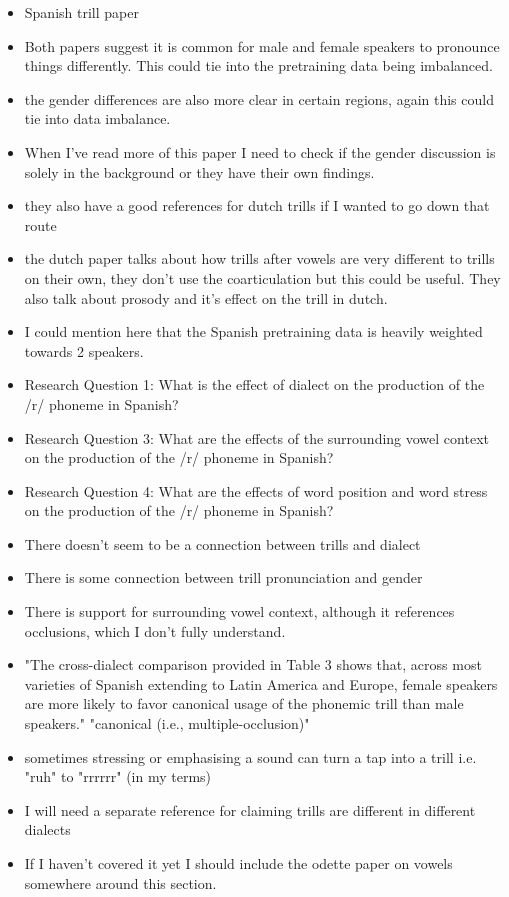\begin{itemize}
    \item Spanish trill paper \cite{henriksen2023sociophonetic}
    \item Both papers suggest it is common for male and female speakers to pronounce things differently. This could tie into the pretraining data being imbalanced.
    \item the gender differences are also more clear in certain regions, again this could tie into data imbalance. 
    \item When I've read more of this paper I need to check if the gender discussion is solely in the background or they have their own findings.
    \item they also have a good references for dutch trills if I wanted to go down that route
    \item the dutch paper talks about how trills after vowels are very different to trills on their own, they don't use the coarticulation but this could be useful. They also talk about prosody and it's effect on the trill in dutch.
    \item I could mention here that the Spanish pretraining data is heavily weighted towards 2 speakers.
    \item Research Question 1: What is the effect of dialect on the production of the /r/ phoneme in Spanish?
    \item Research Question 3: What are the effects of the surrounding vowel context on the production of the /r/ phoneme in Spanish?
    \item Research Question 4: What are the effects of word position and word stress on the production of the /r/ phoneme in Spanish?
    \item There doesn't seem to be a connection between trills and dialect
    \item There is some connection between trill pronunciation and gender
    \item There is support for surrounding vowel context, although it references occlusions, which I don't fully understand.
    \item "The cross-dialect comparison provided in Table 3 shows that, across most varieties of Spanish extending to Latin America and Europe, female speakers are more likely to favor canonical usage of the phonemic trill than male speakers." "canonical (i.e., multiple-occlusion)"
    \item sometimes stressing or emphasising a sound can turn a tap into a trill i.e. "ruh" to "rrrrrr" (in my terms)
    \item I will need a separate reference for claiming trills are different in different dialects
    

    \item If I haven't covered it yet I should include the odette paper on vowels somewhere around this section.
\end{itemize}


